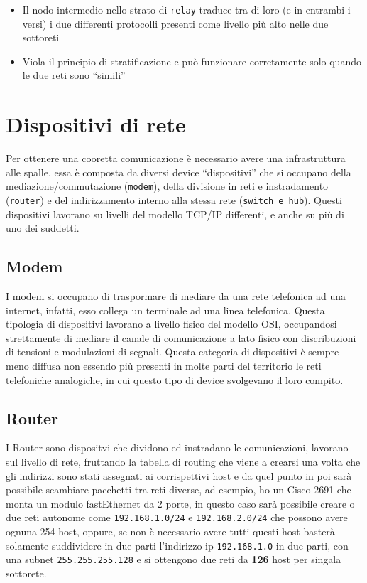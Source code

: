 \documentclass{book}
\theoremstyle{definition}
\begin{document}
\begin{itemize}
\item Il nodo intermedio nello strato di \texttt{relay} traduce tra di loro (e in entrambi i versi) i due
  differenti protocolli presenti come livello più alto nelle due sottoreti
\item Viola il principio di stratificazione e può funzionare corretamente solo quando le due reti sono ``simili''
\end{itemize}

\chapter{Dispositivi di rete}
\label{chap:dispositividirete}

Per ottenere una cooretta comunicazione è necessario avere una infrastruttura alle spalle, essa è composta da diversi device ``dispositivi'' che si occupano della mediazione/commutazione (\texttt{modem}), della divisione in reti e instradamento (\texttt{router}) e del indirizzamento interno alla stessa rete (\texttt{switch e hub}). Questi dispositivi lavorano su livelli del modello TCP/IP differenti, e anche su più di uno dei suddetti.

\section{Modem}
\label{sec:modem}
I modem si occupano di traspormare di mediare da una rete telefonica ad una internet, infatti, esso collega un terminale ad una linea telefonica. Questa tipologia di dispositivi lavorano a livello fisico del modello OSI, occupandosi strettamente di mediare il canale di comunicazione a lato fisico con discribuzioni di tensioni e modulazioni di segnali. Questa categoria di dispositivi è sempre meno diffusa non essendo più presenti in molte parti del territorio le reti telefoniche analogiche, in cui questo tipo di device svolgevano il loro compito.

\section{Router}
\label{sec:router}

I Router sono dispositvi che dividono ed instradano le comunicazioni, lavorano sul livello di rete, fruttando la tabella di routing che viene a crearsi una volta che gli indirizzi sono stati assegnati ai corrispettivi host e da quel punto in poi sarà possibile scambiare pacchetti tra reti diverse, ad esempio, ho un Cisco 2691 che monta un modulo fastEthernet da 2 porte, in questo caso sarà possibile creare o due reti autonome come \texttt{192.168.1.0/24} e \texttt{192.168.2.0/24} che possono avere ognuna 254 host, oppure, se non è necessario avere tutti questi host basterà solamente suddividere in due parti l'indirizzo ip \texttt{192.168.1.0} in due parti, con una subnet \texttt{255.255.255.128} e si ottengono due reti da \textbf{126} host per singala sottorete.
\end{document}
